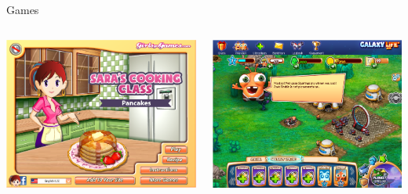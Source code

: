 \documentclass[aspectratio=169]{beamer}
\begin{document}
\begin{frame}{Games}
    \begin{columns}
        \begin{column}[c]{0.5\textwidth}
            \includegraphics[width=\textwidth]{images/sarah.png}
        \end{column}
        \begin{column}[c]{0.5\textwidth}
            \includegraphics[width=\textwidth]{images/galaxylife.png}
        \end{column}
    \end{columns}
\end{frame}
\end{document}
